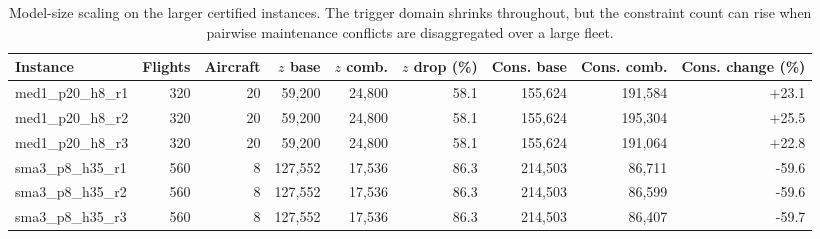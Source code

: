 \begin{table}[htbp]
\centering\small
\caption{Model-size scaling on the larger certified instances. The trigger domain shrinks throughout, but the constraint count can rise when pairwise maintenance conflicts are disaggregated over a large fleet.}
\label{tab:strength_bounds_scaling}
\begin{tabular}{lrrrrrrrr}
\toprule
Instance & Flights & Aircraft & $z$ base & $z$ comb. & $z$ drop (\%) & Cons. base & Cons. comb. & Cons. change (\%) \\
\midrule
med1\_p20\_h8\_r1 & 320 & 20 & 59,200 & 24,800 & 58.1 & 155,624 & 191,584 & $+$23.1 \\
med1\_p20\_h8\_r2 & 320 & 20 & 59,200 & 24,800 & 58.1 & 155,624 & 195,304 & $+$25.5 \\
med1\_p20\_h8\_r3 & 320 & 20 & 59,200 & 24,800 & 58.1 & 155,624 & 191,064 & $+$22.8 \\
sma3\_p8\_h35\_r1 & 560 & 8 & 127,552 & 17,536 & 86.3 & 214,503 & 86,711 & -59.6 \\
sma3\_p8\_h35\_r2 & 560 & 8 & 127,552 & 17,536 & 86.3 & 214,503 & 86,599 & -59.6 \\
sma3\_p8\_h35\_r3 & 560 & 8 & 127,552 & 17,536 & 86.3 & 214,503 & 86,407 & -59.7 \\
\bottomrule
\end{tabular}
\end{table}
